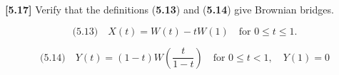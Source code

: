 \documentclass{article}
\begin{document}
\textbf{[5.17]} Verify that the definitions (\textbf{5.13}) and (\textbf{5.14}) give Brownian bridges.


\[
\text{(5.13)} \quad X(t) = W(t) - tW(1) \quad \text{for } 0 \leq t \leq 1.
\]


\[
\text{(5.14)} \quad Y(t) = (1 - t)W\left( \frac{t}{1 - t} \right) \quad \text{for } 0 \leq t < 1, \quad Y(1) = 0
\]

\end{document}
